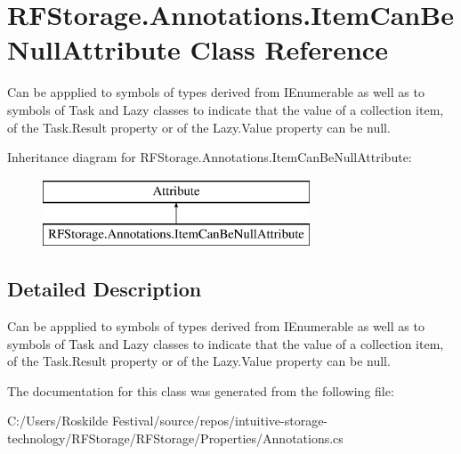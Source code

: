\section{R\+F\+Storage.\+Annotations.\+Item\+Can\+Be\+Null\+Attribute Class Reference}
\label{class_r_f_storage_1_1_annotations_1_1_item_can_be_null_attribute}


Can be appplied to symbols of types derived from I\+Enumerable as well as to symbols of Task and Lazy classes to indicate that the value of a collection item, of the Task.\+Result property or of the Lazy.\+Value property can be null.  


Inheritance diagram for R\+F\+Storage.\+Annotations.\+Item\+Can\+Be\+Null\+Attribute\+:\begin{figure}[H]
\begin{center}
\leavevmode
\includegraphics[height=2.000000cm]{class_r_f_storage_1_1_annotations_1_1_item_can_be_null_attribute}
\end{center}
\end{figure}


\subsection{Detailed Description}
Can be appplied to symbols of types derived from I\+Enumerable as well as to symbols of Task and Lazy classes to indicate that the value of a collection item, of the Task.\+Result property or of the Lazy.\+Value property can be null. 



The documentation for this class was generated from the following file\+:\begin{DoxyCompactItemize}
\item 
C\+:/\+Users/\+Roskilde Festival/source/repos/intuitive-\/storage-\/technology/\+R\+F\+Storage/\+R\+F\+Storage/\+Properties/Annotations.\+cs\end{DoxyCompactItemize}
